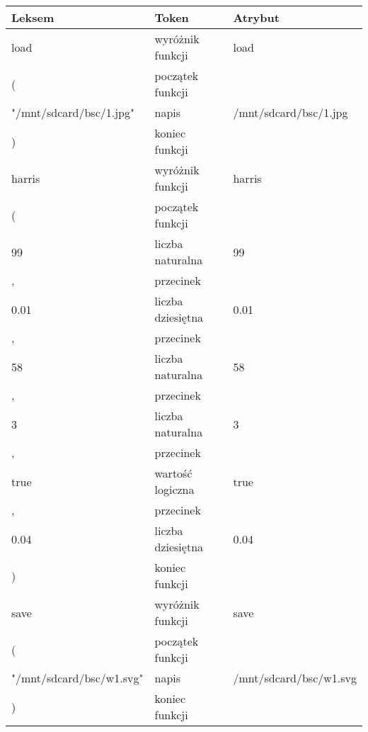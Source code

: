 \documentclass[11pt,a4paper]{article}
\begin{document}
\begin{center}
\begin{tabular}{ | l | l | l | }
\hline                        
\bf{Leksem} & \bf{Token} & \bf{Atrybut} \\ \hline        
load & wyróżnik funkcji & load\\ \hline
(& początek funkcji & \\ \hline    
"/mnt/sdcard/bsc/1.jpg" & napis & /mnt/sdcard/bsc/1.jpg\\ \hline   
) & koniec funkcji &\\ \hline   
harris & wyróżnik funkcji & harris\\ \hline
(& początek funkcji & \\ \hline  
99 & liczba naturalna &99\\ \hline   
, & przecinek &\\ \hline   
0.01 & liczba dziesiętna &0.01\\ \hline   
, & przecinek &\\ \hline    
58 & liczba naturalna &58\\ \hline   
, & przecinek &\\ \hline   
3 & liczba naturalna &3\\ \hline   
, & przecinek &\\ \hline   
true & wartość logiczna & true\\ \hline   
, & przecinek &\\ \hline   
0.04 & liczba dziesiętna &0.04\\ \hline   
) & koniec funkcji &\\ \hline   
save & wyróżnik funkcji & save\\ \hline
( & początek funkcji & \\ \hline
"/mnt/sdcard/bsc/w1.svg" & napis & /mnt/sdcard/bsc/w1.svg\\ \hline   
) & koniec funkcji &\\ \hline   
\end{tabular}
\end{center}
\end{document}
